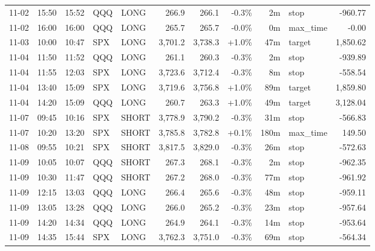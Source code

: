 \documentclass[11pt,a4paper,twoside]{article}
\begin{document}
\begin{center}
\begin{longtable}{>{\color{txtmain}}l l l l l r r r r >{\color{txtmain}}l r}
11-02 & 15:50 & 15:52 & QQQ & LONG & 266.9 & 266.1 & \textcolor{lossred}{-0.3\%} & 2m & stop & \textcolor{lossred}{-960.77} \\
11-02 & 16:00 & 16:00 & QQQ & LONG & 265.7 & 265.7 & \textcolor{lossred}{-0.0\%} & 0m & max\_time & \textcolor{lossred}{-0.00} \\
11-03 & 10:00 & 10:47 & SPX & LONG & 3,701.2 & 3,738.3 & \textcolor{wingreen}{+1.0\%} & 47m & target & \textcolor{wingreen}{1,850.62} \\
11-04 & 11:50 & 11:52 & QQQ & LONG & 261.1 & 260.3 & \textcolor{lossred}{-0.3\%} & 2m & stop & \textcolor{lossred}{-939.89} \\
11-04 & 11:55 & 12:03 & SPX & LONG & 3,723.6 & 3,712.4 & \textcolor{lossred}{-0.3\%} & 8m & stop & \textcolor{lossred}{-558.54} \\
11-04 & 13:40 & 15:09 & SPX & LONG & 3,719.6 & 3,756.8 & \textcolor{wingreen}{+1.0\%} & 89m & target & \textcolor{wingreen}{1,859.80} \\
11-04 & 14:20 & 15:09 & QQQ & LONG & 260.7 & 263.3 & \textcolor{wingreen}{+1.0\%} & 49m & target & \textcolor{wingreen}{3,128.04} \\
11-07 & 09:45 & 10:16 & SPX & SHORT & 3,778.9 & 3,790.2 & \textcolor{lossred}{-0.3\%} & 31m & stop & \textcolor{lossred}{-566.83} \\
11-07 & 10:20 & 13:20 & SPX & SHORT & 3,785.8 & 3,782.8 & \textcolor{wingreen}{+0.1\%} & 180m & max\_time & \textcolor{wingreen}{149.50} \\
11-08 & 09:55 & 10:21 & SPX & SHORT & 3,817.5 & 3,829.0 & \textcolor{lossred}{-0.3\%} & 26m & stop & \textcolor{lossred}{-572.63} \\
11-09 & 10:05 & 10:07 & QQQ & SHORT & 267.3 & 268.1 & \textcolor{lossred}{-0.3\%} & 2m & stop & \textcolor{lossred}{-962.35} \\
11-09 & 10:30 & 11:47 & QQQ & SHORT & 267.2 & 268.0 & \textcolor{lossred}{-0.3\%} & 77m & stop & \textcolor{lossred}{-961.92} \\
11-09 & 12:15 & 13:03 & QQQ & LONG & 266.4 & 265.6 & \textcolor{lossred}{-0.3\%} & 48m & stop & \textcolor{lossred}{-959.11} \\
11-09 & 13:05 & 13:28 & QQQ & LONG & 266.0 & 265.2 & \textcolor{lossred}{-0.3\%} & 23m & stop & \textcolor{lossred}{-957.64} \\
11-09 & 14:20 & 14:34 & QQQ & LONG & 264.9 & 264.1 & \textcolor{lossred}{-0.3\%} & 14m & stop & \textcolor{lossred}{-953.64} \\
11-09 & 14:35 & 15:44 & SPX & LONG & 3,762.3 & 3,751.0 & \textcolor{lossred}{-0.3\%} & 69m & stop & \textcolor{lossred}{-564.34} \\

\end{longtable}
\end{center}
\end{document}
